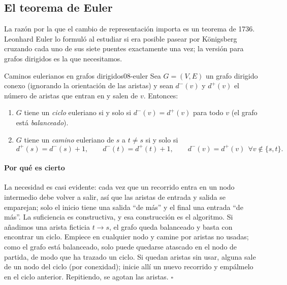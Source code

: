 \subsection{El teorema de Euler}

La razón por la que el cambio de representación importa es un teorema de 1736. Leonhard Euler lo formuló al estudiar si era posible pasear por Königsberg cruzando cada uno de sus siete puentes exactamente una vez; la versión para grafos dirigidos es la que necesitamos.

\begin{teorema}{Caminos eulerianos en grafos dirigidos}{08-euler}
Sea $G=(V,E)$ un grafo dirigido conexo (ignorando la orientación de las aristas) y sean $d^{-}(v)$ y $d^{+}(v)$ el número de aristas que entran en y salen de $v$. Entonces:
\begin{enumerate}
  \item $G$ tiene un \emph{ciclo} euleriano si y solo si $d^{-}(v)=d^{+}(v)$ para todo $v$ (el grafo está \emph{balanceado}).
  \item $G$ tiene un \emph{camino} euleriano de $s$ a $t\ne s$ si y solo si
  \begin{equation}\label{eq:08-euler}
  d^{+}(s)=d^{-}(s)+1,\qquad d^{-}(t)=d^{+}(t)+1,\qquad d^{-}(v)=d^{+}(v)\ \ \forall v\notin\{s,t\}.
  \end{equation}
\end{enumerate}
\end{teorema}

\begin{simbolos}
\end{simbolos}

\paragraph{Por qué es cierto} La necesidad es casi evidente: cada vez que un recorrido entra en un nodo intermedio debe volver a salir, así que las aristas de entrada y salida se emparejan; solo el inicio tiene una salida ``de más'' y el final una entrada ``de más''. La suficiencia es constructiva, y esa construcción es el algoritmo. Si añadimos una arista ficticia $t\to s$, el grafo queda balanceado y basta con encontrar un ciclo. Empiece en cualquier nodo y camine por aristas no usadas; como el grafo está balanceado, solo puede quedarse atascado en el nodo de partida, de modo que ha trazado un ciclo. Si quedan aristas sin usar, alguna sale de un nodo del ciclo (por conexidad); inicie allí un nuevo recorrido y empálmelo en el ciclo anterior. Repitiendo, se agotan las aristas. $\square$

